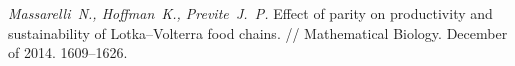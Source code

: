 \documentclass[11pt]{article}
\begin{document}
\clearpage
\newpage
\begin{thebibliography}{0}
 {\it Massarelli~N., Hoffman~K., Previte~J.~P.} Effect of parity on productivity and sustainability of Lotka–Volterra food chains. // Mathematical Biology. December of 2014. 1609--1626.
\end{thebibliography}
\end{document}
